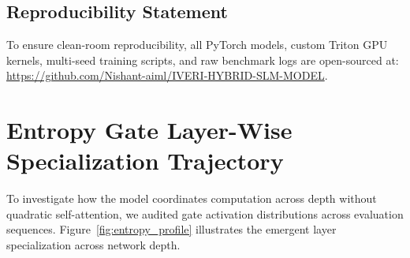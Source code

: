 \documentclass[10pt,twocolumn,letterpaper]{article}
\begin{document}
\subsection*{Reproducibility Statement}
To ensure clean-room reproducibility, all PyTorch models, custom Triton GPU kernels, multi-seed training scripts, and raw benchmark logs are open-sourced at:
\url{https://github.com/Nishant-aiml/IVERI-HYBRID-SLM-MODEL}.




\clearpage
\appendix

\section{Entropy Gate Layer-Wise Specialization Trajectory}
\label{app:entropy}

To investigate how the model coordinates computation across depth without quadratic self-attention, we audited gate activation distributions across evaluation sequences. Figure~\ref{fig:entropy_profile} illustrates the emergent layer specialization across network depth.
\end{document}

